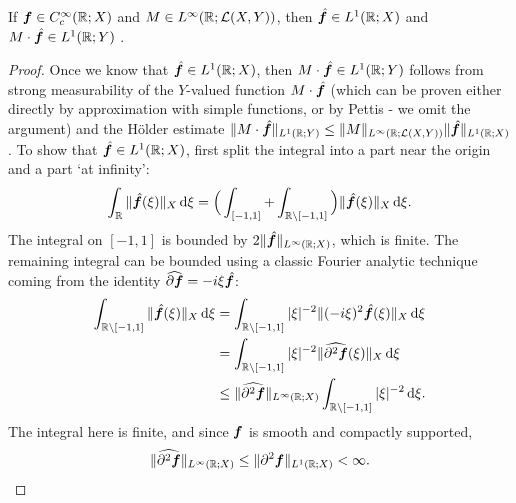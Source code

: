 \begin{prop}
  If $\bm{f} \in C_{c}^\infty(\mathbb{R};X)$ and $M \in L^\infty(\mathbb{R};\mathcal{L}(X,Y))$, then $\hat{\bm{f}} \in L^1(\mathbb{R};X)$ and $M \cdot \hat{\bm{f}} \in L^1(\mathbb{R};Y)$ .
\end{prop}

\begin{proof}
  Once we know that $\hat{\bm{f}} \in L^1(\mathbb{R};X)$, then $M \cdot \hat{\bm{f}} \in L^1(\mathbb{R};Y)$ follows from strong measurability of the $Y$-valued function $M \cdot \hat{\bm{f}}$ (which can be proven either directly by approximation with simple functions, or by Pettis - we omit the argument) and the H\"older estimate $\|M \cdot \hat{\bm{f}}\|_{L^1(\mathbb{R};Y)} \leq \|M\|_{L^\infty(\mathbb{R};\mathcal{L}(X,Y))} \|\hat{\bm{f}}\|_{L^1(\mathbb{R};X)}$.
  To show that $\hat{\bm{f}} \in L^1(\mathbb{R};X)$, first split the integral into a part near the origin and a part `at infinity':
  \begin{equation*}
    \int_{\mathbb{R}} \|\hat{\bm{f}}(\xi)\|_{X} \, \mathrm{d}\xi = \Big( \int_{[-1,1]} + \int_{\mathbb{R} \setminus [-1,1]} \Big) \|\hat{\bm{f}}(\xi)\|_{X} \, \mathrm{d}\xi.
  \end{equation*}
  The integral on $[-1,1]$ is bounded by $2\|\hat{\bm{f}}\|_{L^\infty(\mathbb{R};X)}$, which is finite.
  The remaining integral can be bounded using a classic Fourier analytic technique coming from the identity $\widehat{\partial \bm{f}} = -i\xi \hat{\bm{f}}$:
  \begin{equation*}
    \begin{aligned}
    \int_{\mathbb{R} \setminus [-1,1]} \|\hat{\bm{f}}(\xi)\|_{X} \, \mathrm{d}\xi
    &= \int_{\mathbb{R} \setminus [-1,1]} |\xi|^{-2} \|(-i\xi)^{2}\hat{\bm{f}}(\xi)\|_{X} \, \mathrm{d}\xi \\
    &= \int_{\mathbb{R} \setminus [-1,1]} |\xi|^{-2} \|\widehat{\partial^{2} \bm{f}}(\xi)\|_{X} \, \mathrm{d}\xi \\
    &\leq \|\widehat{\partial^{2} \bm{f}}\|_{L^\infty(\mathbb{R};X)} \int_{\mathbb{R} \setminus [-1,1]} |\xi|^{-2} \, \mathrm{d}\xi .
  \end{aligned}
\end{equation*}
The integral here is finite, and since $\bm{f}$ is smooth and compactly supported, 
\begin{equation*}
   \|\widehat{\partial^{2} \bm{f}}\|_{L^\infty(\mathbb{R};X)} \leq \|\partial^{2} \bm{f}\|_{L^1(\mathbb{R};X)} < \infty.
\end{equation*}
\end{proof}

